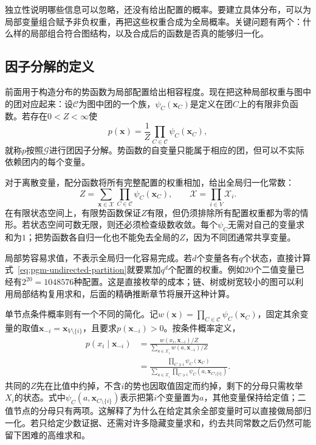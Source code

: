 独立性说明哪些信息可以忽略，还没有给出配置的概率。要建立具体分布，可以为局部变量组合赋予非负权重，再把这些权重合成为全局概率。关键问题有两个：什么样的局部组合符合图结构，以及合成后的函数是否真的能够归一化。

\subsection{因子分解的定义}
\label{sec:pgm-undirected-factorization-definition}

前面用于构造分布的势函数为局部配置给出相容程度。现在把这种局部权重与图中的团对应起来：设$\mathcal{C}$为图中团的一个族，$\psi_C(\bm{x}_C)$是定义在团$C$上的有限非负函数。若存在$0<Z<\infty$使
\begin{equation}
  p(\bm{x})=\frac{1}{Z}\prod_{C\in\mathcal{C}}\psi_C(\bm{x}_C),
  \label{eq:pgm-undirected-factorization}
\end{equation}
就称$p$按照$\mathcal{G}$进行团因子分解。势函数的自变量只能属于相应的团，但可以不实际依赖团内的每个变量。

对于离散变量，配分函数将所有完整配置的权重相加，给出全局归一化常数：
\begin{equation}
  Z=\sum_{\bm{x}\in\mathcal{X}}\prod_{C\in\mathcal{C}}\psi_C(\bm{x}_C),
  \qquad
  \mathcal{X}=\prod_{i\in V}\mathcal{X}_i.
  \label{eq:pgm-undirected-partition}
\end{equation}
在有限状态空间上，有限势函数保证$Z$有限，但仍须排除所有配置权重都为零的情形。若状态空间可数无限，则还必须检查级数收敛。每个$\psi_C$无需对自己的变量求和为$1$；把势函数各自归一化也不能免去全局的$Z$，因为不同团通常共享变量。

局部势容易求值，不表示全局归一化容易完成。若$d$个变量各有$q$个状态，直接计算式~\eqref{eq:pgm-undirected-partition}就要累加$q^d$个配置的权重。例如$20$个二值变量已经有$2^{20}=1048576$种配置。这是直接枚举的成本；链、树或树宽较小的图可以利用局部结构复用求和，后面的精确推断章节将展开这种计算。

单节点条件概率则有一个不同的简化。记$w(\bm{x})=\prod_{C\in\mathcal C}\psi_C(\bm{x}_C)$，固定其余变量的取值$\bm{x}_{-i}=\bm{x}_{V\setminus\{i\}}$，且要求$p(\bm{x}_{-i})>0$。按条件概率定义，
\begin{equation}
  \begin{aligned}
    p(x_i\mid\bm{x}_{-i})
      &=\frac{w(x_i,\bm{x}_{-i})/Z}
        {\sum_{a\in\mathcal X_i}w(a,\bm{x}_{-i})/Z}\\
      &=\frac{\prod_{C\ni i}\psi_C(\bm{x}_C)}
        {\sum_{a\in\mathcal X_i}
          \prod_{C\ni i}\psi_C(a,\bm{x}_{C\setminus\{i\}})}.
  \end{aligned}
  \label{eq:pgm-undirected-local-conditional}
\end{equation}
共同的$Z$先在比值中约掉，不含$i$的势也因取值固定而约掉，剩下的分母只需枚举$X_i$的状态。式中$\psi_C(a,\bm{x}_{C\setminus\{i\}})$表示把第$i$个变量置为$a$，其他变量保持给定值；二值节点的分母只有两项。这解释了为什么在给定其余全部变量时可以直接做局部归一化。若只给定少数证据、还需对许多隐藏变量求和，约去共同常数之后仍然可能留下困难的高维求和。

